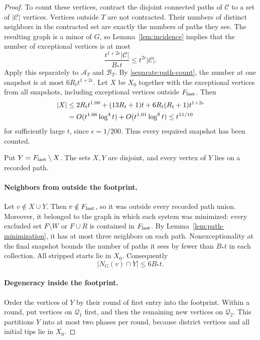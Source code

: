 \begin{proof}
To count these vertices, contract the disjoint connected paths of
\(\mathcal C\) to a set of \(|\mathcal C|\) vertices. Vertices outside
\(T\) are not contracted. Their numbers of distinct neighbors in the
contracted set are exactly the numbers of paths they see. The
resulting graph is a minor of \(G\), so Lemma~\ref{lem:incidence}
implies that the number of exceptional vertices is at most
\[
 \frac{t^{1+2\epsilon}|\mathcal C|}{B_*t}
 \le t^{2\epsilon}|\mathcal C|.
\]
Apply this separately to \(\mathcal A_T\) and \(\mathcal B_T\).
By \eqref{separate:path-count}, the number at one snapshot is at most
\(6R_t t^{1+2\epsilon}\). Let \(X\) be \(X_0\) together with the
exceptional vertices from all snapshots, including exceptional
vertices outside \(F_{\rm last}\). Then
\begin{align}
 \label{separate:x-bound}
 |X|
 &\le 2R_t t^{1.06}+(13R_t+1)t
       +6R_t(R_t+1)t^{1+2\epsilon}\notag\\
 &=O(t^{1.06}\log^4t)+O(t^{1.01}\log^8t)
 \le t^{11/10}
\end{align}
for sufficiently large \(t\), since \(\epsilon=1/200\).
Thus every required snapshot has been counted.

Put \(Y=F_{\rm last}\setminus X\). The sets \(X,Y\) are disjoint,
and every vertex of \(Y\) lies on a recorded path.

\paragraph{Neighbors from outside the footprint.}
Let \(v\notin X\cup Y\). Then \(v\notin F_{\rm last}\), so it was
outside every recorded path union. Moreover, it belonged to the
graph in which each system was minimized: every excluded set
\(F\setminus W\) or \(F\cup R\) is contained in \(F_{\rm last}\).
By Lemma~\ref{lem:path-minimization}, it has at most three neighbors
on each path. Nonexceptionality at the final snapshot bounds the
number of paths it sees by fewer than \(B_*t\) in each collection.
All stripped starts lie in \(X_0\). Consequently
\begin{equation}
 \label{separate:external-degree}
 |N_G(v)\cap Y|\le6B_*t.
\end{equation}

\paragraph{Degeneracy inside the footprint.}
Order the vertices of \(Y\) by their round of first entry into the
footprint. Within a round, put vertices on \(\mathcal Q_1\) first,
and then the remaining new vertices on \(\mathcal Q_2\).
This partitions \(Y\) into at most two phases per round, because
district vertices and all initial tips lie in \(X_0\).


\end{proof}

